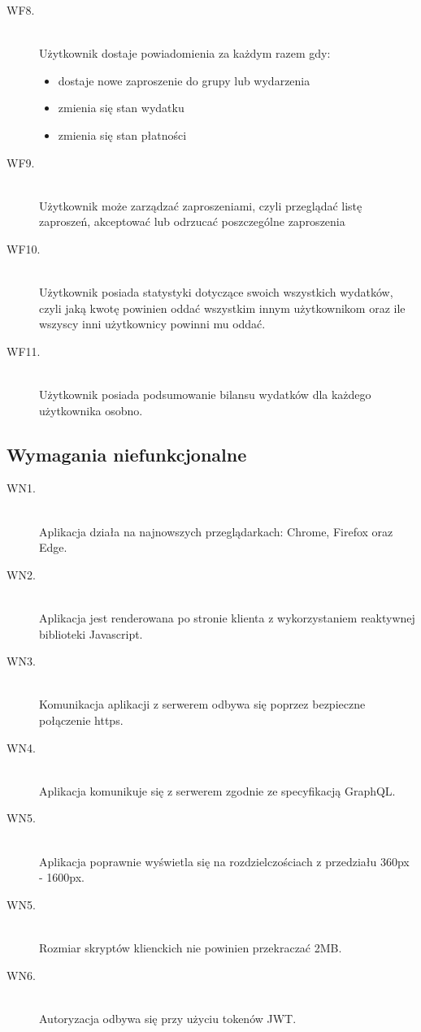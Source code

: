 \begin{description}
  \item[WF8.] \hfill \\ Użytkownik dostaje powiadomienia za każdym razem gdy:
    \begin{itemize}
      \item dostaje nowe zaproszenie do grupy lub wydarzenia
      \item zmienia się stan wydatku
      \item zmienia się stan płatności
    \end{itemize}
  \item[WF9.] \hfill \\ Użytkownik może zarządzać zaproszeniami, czyli przeglądać listę zaproszeń, akceptować lub odrzucać poszczególne zaproszenia
  \item[WF10.] \hfill \\ Użytkownik posiada statystyki dotyczące swoich wszystkich wydatków, czyli jaką kwotę powinien oddać wszystkim innym użytkownikom oraz ile wszyscy inni użytkownicy powinni mu oddać.
  \item[WF11.] \hfill \\ Użytkownik posiada podsumowanie bilansu wydatków dla każdego użytkownika osobno.
\end{description}

\subsection{Wymagania niefunkcjonalne}
\begin{description}
  \item[WN1.] \hfill \\ Aplikacja działa na najnowszych przeglądarkach: Chrome, Firefox oraz Edge.
  \item[WN2.] \hfill \\ Aplikacja jest renderowana po stronie klienta z wykorzystaniem reaktywnej biblioteki Javascript.
  \item[WN3.] \hfill \\ Komunikacja aplikacji z serwerem odbywa się poprzez bezpieczne połączenie https.
  \item[WN4.] \hfill \\ Aplikacja komunikuje się z serwerem zgodnie ze specyfikacją GraphQL.
  \item[WN5.] \hfill \\ Aplikacja poprawnie wyświetla się na rozdzielczościach z przedziału 360px - 1600px.
  \item[WN5.] \hfill \\ Rozmiar skryptów klienckich nie powinien przekraczać 2MB.
  \item[WN6.] \hfill \\ Autoryzacja odbywa się przy użyciu tokenów JWT.
\end{description}
